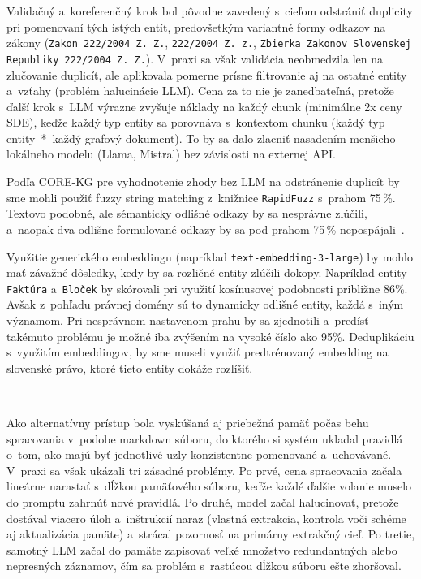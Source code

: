 Validačný a~koreferenčný krok bol pôvodne zavedený s~cieľom odstrániť duplicity pri pomenovaní tých istých entít, predovšetkým variantné formy odkazov na zákony (\texttt{Zakon 222/2004 Z. Z.}, \texttt{222/2004 Z. z.}, \texttt{Zbierka Zakonov Slovenskej Republiky 222/2004 Z. Z.}). V~praxi sa však validácia neobmedzila len na zlučovanie duplicít, ale aplikovala pomerne prísne filtrovanie aj na ostatné entity a~vzťahy (problém halucinácie LLM). Cena za to nie je zanedbateľná, pretože ďalší krok s~LLM výrazne zvyšuje náklady na každý chunk (minimálne 2x ceny SDE), keďže každý typ entity sa porovnáva s~kontextom chunku (každý typ entity~*~každý grafový dokument). To by sa dalo zlacniť nasadením menšieho lokálneho modelu (Llama, Mistral) bez závislosti na externej API.

Podľa CORE-KG pre vyhodnotenie zhody bez LLM na odstránenie duplicít by sme mohli použiť fuzzy string matching z~knižnice \texttt{RapidFuzz} s~prahom 75\,\%. Textovo podobné, ale sémanticky odlišné odkazy by sa nesprávne zlúčili, a~naopak dva odlišne formulované odkazy by sa pod prahom 75\,\% nepospájali~\cite{meher2025corekgllmdrivenknowledgegraph}.

Využitie generického embeddingu (napríklad \texttt{text-embedding-3-large}) by mohlo mať závažné dôsledky, kedy by sa rozličné entity zlúčili dokopy. Napríklad entity \texttt{Faktúra} a~\texttt{Bloček} by skórovali pri využití kosínusovej podobnosti približne 86\%. Avšak z~pohľadu právnej domény sú to dynamicky odlišné entity, každá s~iným významom. Pri nesprávnom nastavenom prahu by sa zjednotili a~predísť takémuto problému je možné iba zvýšením na vysoké číslo ako 95\%. Deduplikáciu s~využitím embeddingov, by sme museli využiť predtrénovaný embedding na slovenské právo, ktoré tieto entity dokáže rozlíšiť.

\

Ako alternatívny prístup bola vyskúšaná aj priebežná pamäť počas behu spracovania v~podobe markdown súboru, do ktorého si systém ukladal pravidlá o~tom, ako majú byť jednotlivé uzly konzistentne pomenované a~uchovávané. V~praxi sa však ukázali tri zásadné problémy. Po prvé, cena spracovania začala lineárne narastať s~dĺžkou pamäťového súboru, keďže každé ďalšie volanie muselo do promptu zahrnúť nové pravidlá. Po druhé, model začal halucinovať, pretože dostával viacero úloh a~inštrukcií naraz (vlastná extrakcia, kontrola voči schéme aj aktualizácia pamäte) a~strácal pozornosť na primárny extrakčný cieľ. Po tretie, samotný LLM začal do pamäte zapisovať veľké množstvo redundantných alebo nepresných záznamov, čím sa problém s~rastúcou dĺžkou súboru ešte zhoršoval.

